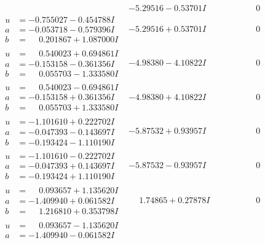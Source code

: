 \documentclass[1p]{elsarticle_modified}
\theoremstyle{definition}
\begin{document}
$$\begin{array}{c|c|c}
 & -5.29516 - 0.53701 I & \phantom{-0.000000 } 0 \\ \hline\begin{aligned}
u &= -0.755027 - 0.454788 I \\
a &= -0.053718 - 0.579396 I \\
b &= \phantom{-}0.201867 + 1.087000 I\end{aligned}
 & -5.29516 + 0.53701 I & \phantom{-0.000000 } 0 \\ \hline\begin{aligned}
u &= \phantom{-}0.540023 + 0.694861 I \\
a &= -0.153158 - 0.361356 I \\
b &= \phantom{-}0.055703 - 1.333580 I\end{aligned}
 & -4.98380 - 4.10822 I & \phantom{-0.000000 } 0 \\ \hline\begin{aligned}
u &= \phantom{-}0.540023 - 0.694861 I \\
a &= -0.153158 + 0.361356 I \\
b &= \phantom{-}0.055703 + 1.333580 I\end{aligned}
 & -4.98380 + 4.10822 I & \phantom{-0.000000 } 0 \\ \hline\begin{aligned}
u &= -1.101610 + 0.222702 I \\
a &= -0.047393 - 0.143697 I \\
b &= -0.193424 - 1.110190 I\end{aligned}
 & -5.87532 + 0.93957 I & \phantom{-0.000000 } 0 \\ \hline\begin{aligned}
u &= -1.101610 - 0.222702 I \\
a &= -0.047393 + 0.143697 I \\
b &= -0.193424 + 1.110190 I\end{aligned}
 & -5.87532 - 0.93957 I & \phantom{-0.000000 } 0 \\ \hline\begin{aligned}
u &= \phantom{-}0.093657 + 1.135620 I \\
a &= -1.409940 + 0.061582 I \\
b &= \phantom{-}1.216810 + 0.353798 I\end{aligned}
 & \phantom{-}1.74865 + 0.27878 I & \phantom{-0.000000 } 0 \\ \hline\begin{aligned}
u &= \phantom{-}0.093657 - 1.135620 I \\
a &= -1.409940 - 0.061582 I \\

\end{aligned}
\end{array}$$
\end{document}
